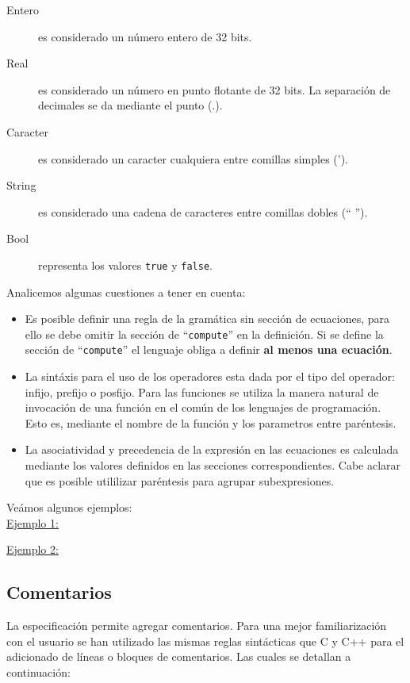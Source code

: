 \begin{description}
\item [Entero] es considerado un número entero de 32 bits. 
\item [Real] es considerado un número en punto flotante de 32 bits. La separación de decimales se da mediante el punto (.).
\item [Caracter] es considerado un caracter cualquiera entre comillas simples (').
\item [String] es considerado una cadena de caracteres entre comillas dobles (`` '').
\item [Bool] representa los valores \texttt{true} y \texttt{false}.
\end{description}

Analicemos algunas cuestiones a tener en cuenta:

\begin{itemize}
\item Es posible definir una regla de la gramática sin sección de ecuaciones, para ello se debe omitir la sección de ``\texttt{compute}'' en la definición. Si se define la sección de ``\texttt{compute}'' el lenguaje obliga a definir \textbf{al menos una ecuación}.

\item La sintáxis para el uso de los operadores esta dada por el tipo del operador: infijo, prefijo o posfijo. Para las funciones se utiliza la manera natural de invocación de una función en el común de los lenguajes de programación. Esto es, mediante el nombre de la función y los parametros entre paréntesis.

\item La asociatividad y precedencia de la expresión en las ecuaciones es calculada mediante los valores definidos en las secciones correspondientes. Cabe aclarar que es posible utililizar paréntesis para agrupar subexpresiones.
\end{itemize}

Veámos algunos ejemplos:\\

\underline{Ejemplo 1:}\ 
\vspace{0.2cm}

\underline{Ejemplo 2:}\ 
\vspace{0.2cm}

\subsection{Comentarios}
La especificación permite agregar comentarios. Para una mejor familiarización con el usuario se han utilizado las mismas reglas sintácticas que C y C++ para el adicionado de líneas o bloques de comentarios. Las cuales se detallan a continuación:

